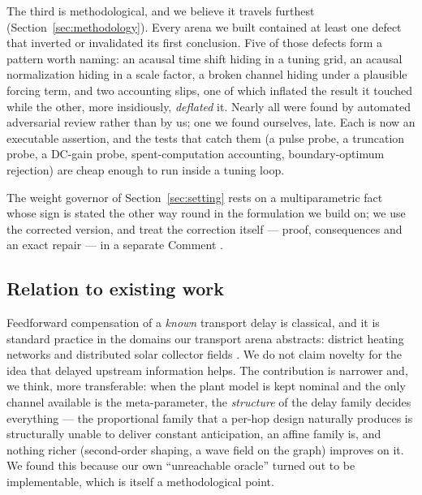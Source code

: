 \documentclass[journal]{IEEEtran}
\theoremstyle{definition}
\begin{document}
The third is methodological, and we believe it travels furthest
(Section~\ref{sec:methodology}). Every arena we built contained at least one
defect that inverted or invalidated its first conclusion. Five of those defects
form a pattern worth naming: an acausal time shift hiding in a tuning grid, an
acausal normalization hiding in a scale factor, a broken channel hiding under a
plausible forcing term, and two accounting slips, one of which inflated the result it touched
while the other, more insidiously, \emph{deflated} it. Nearly all
were found by automated adversarial review rather than by us; one we found
ourselves, late. Each is now an executable assertion, and the tests that catch
them (a pulse probe, a truncation probe, a DC-gain probe, spent-computation
accounting, boundary-optimum rejection) are cheap enough to run inside a tuning
loop.

The weight governor of Section~\ref{sec:setting} rests on a
multiparametric fact whose sign is stated the other way round in the
formulation we build on; we use the corrected version, and treat the
correction itself --- proof, consequences and an exact repair --- in a
separate Comment \cite{comment2026}.

\subsection*{Relation to existing work}
Feedforward compensation of a \emph{known} transport delay is classical, and it
is standard practice in the domains our transport arena abstracts: district
heating networks \cite{zimmerman2019} and distributed solar collector fields
\cite{camacho2007i,camacho2007ii}. We do not claim novelty for the idea that
delayed upstream information helps. The contribution is narrower and, we think,
more transferable: when the plant model is kept nominal and the only channel
available is the meta-parameter, the \emph{structure} of the delay family
decides everything --- the proportional family that a per-hop design naturally
produces is structurally unable to deliver constant anticipation, an affine
family is, and nothing richer (second-order shaping, a wave field on the graph)
improves on it. We found this because our own ``unreachable oracle'' turned out
to be implementable, which is itself a methodological point.
\end{document}
